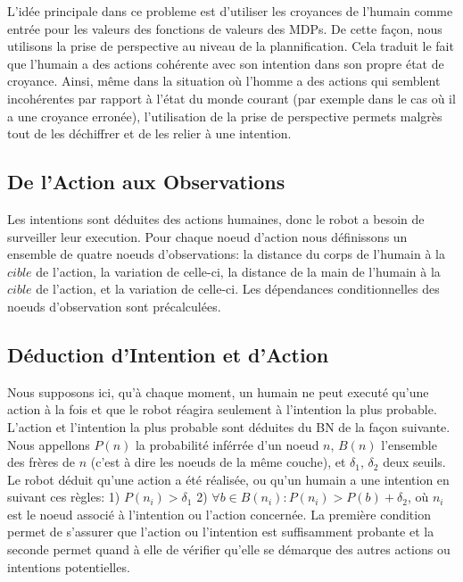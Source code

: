 \documentclass[a4paper,11pt,twoside]{StyleThese}
\begin{document}
L'idée principale dans ce probleme est d'utiliser les croyances de l'humain comme entrée pour les valeurs des fonctions de valeurs des MDPs. De cette façon, nous utilisons la prise de perspective au niveau de la plannification. Cela traduit le fait que l'humain a des actions cohérente avec son intention dans son propre état de croyance. Ainsi, même dans la situation où l'homme a des actions qui semblent incohérentes par rapport à l'état du monde courant (par exemple dans le cas où il a une croyance erronée), l'utilisation de la prise de perspective permets malgrès tout de les déchiffrer et de les relier à une intention.


\subsection{De l'Action aux Observations}
\label{sec:action}
Les intentions sont déduites des actions humaines, donc le robot a besoin de surveiller leur execution. Pour chaque noeud d'action nous définissons un ensemble de quatre noeuds d'observations: la distance du corps de l'humain à la $cible$ de l'action, la variation de celle-ci, la distance de la main de l'humain à la $cible$ de l'action, et la variation de celle-ci.
Les dépendances conditionnelles des noeuds d'observation sont précalculées.

\subsection{Déduction d'Intention et d'Action}
\label{intentiom and action inference}
Nous supposons ici, qu'à chaque moment, un humain ne peut executé qu'une action à la fois et que le robot réagira seulement à l'intention la plus probable. L'action et l'intention la plus probable sont déduites du BN de la façon suivante. Nous appellons $P(n)$ la probabilité inférrée d'un noeud  $n$, $B(n)$ l'ensemble des frères de $n$ (c'est à dire les noeuds de la même couche), et $\delta_1$, $\delta_2$ deux seuils. Le robot déduit qu'une action a été réalisée, ou qu'un humain a une intention en suivant ces règles: 1) \(P(n_i)>\delta_1\) 2) \(\forall b \in B(n_i): P(n_i)>P(b)+\delta_2\), où $n_i$ est le noeud associé à l'intention ou l'action concernée.
La première condition permet de s'assurer que l'action ou l'intention est suffisamment probante et la seconde permet quand à elle de vérifier qu'elle se démarque des autres actions ou intentions potentielles.
\end{document}
